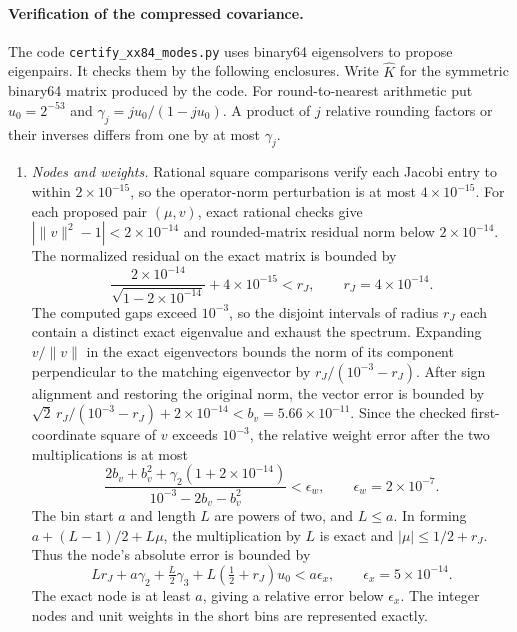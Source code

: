 \paragraph{Verification of the compressed covariance.}
The code \texttt{certify\_xx84\_modes.py} uses binary64 eigensolvers to
propose eigenpairs. It checks them by the following enclosures. Write
$\widehat K$ for the symmetric binary64 matrix produced by the code.
For round-to-nearest arithmetic put $u_0=2^{-53}$ and
$\gamma_j=ju_0/(1-ju_0)$. A product of $j$ relative rounding factors
or their inverses differs from one by at most $\gamma_j$.

\begin{enumerate}
\item \emph{Nodes and weights.} Rational square comparisons verify each
Jacobi entry to within $2\times10^{-15}$, so the operator-norm perturbation
is at most $4\times10^{-15}$. For each proposed pair $(\mu,v)$, exact
rational checks give $|\|v\|^2-1|<2\times10^{-14}$ and rounded-matrix
residual norm below $2\times10^{-14}$. The normalized residual on the
exact matrix is bounded by
\[
 \frac{2\times10^{-14}}{\sqrt{1-2\times10^{-14}}}+4\times10^{-15}
 < r_J,\qquad r_J=4\times10^{-14}.
\]
The computed gaps exceed $10^{-3}$, so the disjoint intervals of radius
$r_J$ each contain a distinct exact eigenvalue and exhaust the spectrum.
Expanding $v/\|v\|$ in the exact eigenvectors bounds the norm of its
component perpendicular to the matching eigenvector by
$r_J/(10^{-3}-r_J)$. After sign alignment and restoring the original norm,
the vector error is bounded by
$\sqrt2\,r_J/(10^{-3}-r_J)+2\times10^{-14}<b_v=5.66\times10^{-11}$.
Since the checked first-coordinate square of $v$ exceeds $10^{-3}$, the
relative weight error after the two multiplications is at most
\[
 \frac{2b_v+b_v^2+\gamma_2(1+2\times10^{-14})}{10^{-3}-2b_v-b_v^2}
 < \epsilon_w,
 \qquad \epsilon_w=2\times10^{-7}.
\]
The bin start $a$ and length $L$ are powers of two, and $L\le a$.
In forming $a+(L-1)/2+L\mu$, the multiplication by $L$ is exact and
$|\mu|\le1/2+r_J$. Thus the node's absolute error is bounded by
\[
 Lr_J+a\gamma_2+\tfrac L2\gamma_3+L(\tfrac12+r_J)u_0
 < a\epsilon_x,\qquad \epsilon_x=5\times10^{-14}.
\]
The exact node is at least $a$, giving a relative error below $\epsilon_x$.
The integer nodes and unit weights in the short bins are represented exactly.


\end{enumerate}
